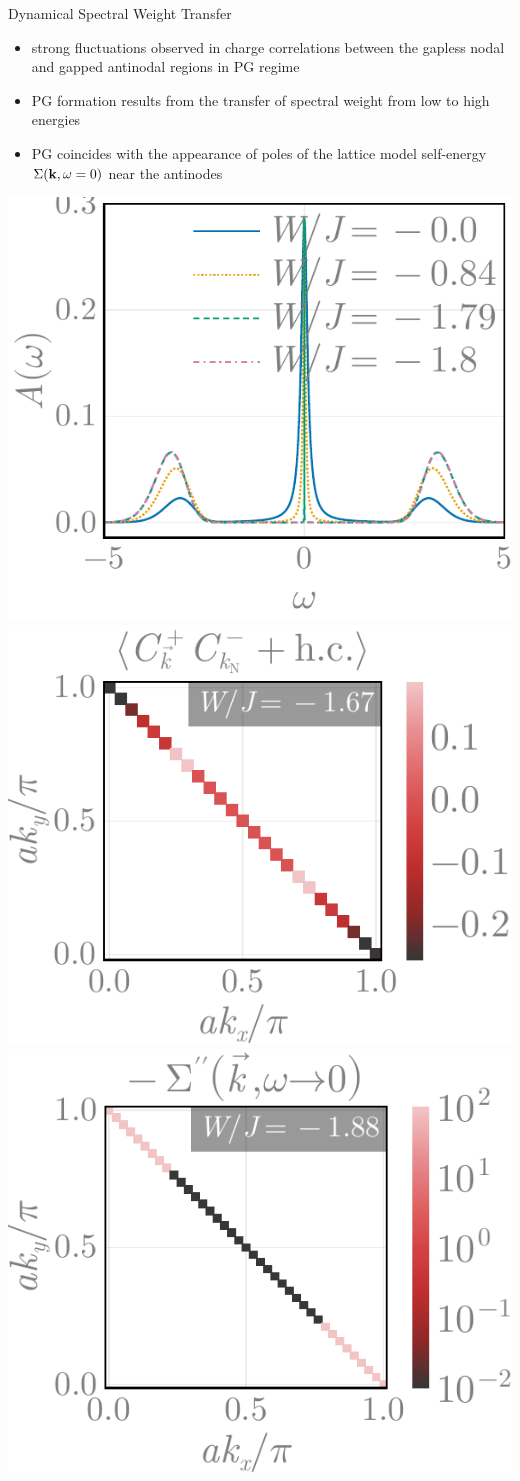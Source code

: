\documentclass[10pt,aspectratio=169]{beamer}
\begin{document}
\begin{frame}{Dynamical Spectral Weight Transfer}
\begin{itemize}
	\item strong fluctuations observed in \alert{charge correlations} between the gapless nodal and gapped antinodal regions in PG regime
	\item PG formation results from the \alert{transfer of spectral weight} from low to high energies
	\item PG coincides with the appearance of poles of the lattice model self-energy $\Sigma ({\bf k},\omega=0)$ near the antinodes
\end{itemize}

\begin{center}
	\includegraphics[width=0.32\linewidth]{impSpecFunc_49-1000.pdf}
    \includegraphics[width=0.32\linewidth]{cfnode-2.pdf}
    \includegraphics[width=0.32\linewidth]{selfEnergyKspace-3.pdf}
\end{center}
\end{frame}
\end{document}
